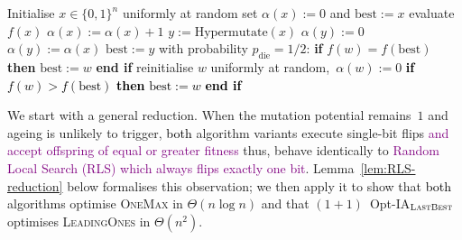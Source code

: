 \documentclass[lettersize,journal]{IEEEtran}
\newcommand{\new}[1]{\textcolor{black}{#1}}
\newcommand{\rerev}[1]{\textcolor{purple}{#1}}
\newcommand{\rev}[1]{\textcolor{black}{#1}}
\newcommand{\lastBest}{$(1+1)$~Opt-IA$_{\textsc{LastBest}}$}
\begin{document}
\begin{algorithm}[t] 
 		\caption{$(1+1)$~Opt-IA$_{\textsc{FirstBest}}$ }
 		\begin{algorithmic}[1] \STATE Initialise $x \in\{0,1\}^n$ uniformly at random \STATE set $\alpha(x):=0$ and $\text{best}:=x$      
 			\STATE evaluate $f(x)$    
 			 \STATE $\alpha(x):=\alpha(x)+1$
 			\STATE $y:=\text{Hypermutate}(x)$
 			\STATE $\alpha(y):=0$
 			\ELSE
 			\STATE $\alpha(y):=\alpha(x)$
 			\ENDIF
 			\STATE $\text{best}:=y$
 			\ENDIF
 			\STATE with probability $p_{\text{die}}=1/2$:
 			\STATE \hspace{\algorithmicindent}
 			\textbf{if} $f(w) = f(\text{best})$ \textbf{then}
 			\STATE \hspace{2\algorithmicindent}
 			$\text{best}:=w$
 			\STATE \hspace{\algorithmicindent}
 			\textbf{end if}
 			\STATE \hspace{\algorithmicindent}
 			reinitialise $w$ uniformly at random,\ $\alpha(w):=0$
 			\textcolor{black}{\STATE \hspace{\algorithmicindent}
 				\textbf{if} $f(w) > f(\text{best})$ \textbf{then}
 				\STATE \hspace{2\algorithmicindent}
 				$\text{best}:=w$
 				\STATE \hspace{\algorithmicindent}
 				\textbf{end if}}
 			\ENDIF
 			\ENDFOR
\rev{ 
\ENDIF}
 			\ENDWHILE
 		\end{algorithmic} 
 		\label{alg:alg2+ageing}
 	\end{algorithm}












We start with a general reduction.  When the mutation potential remains~$1$
and ageing is unlikely to trigger, \new{both} algorithm variants execute
single-bit flips \rerev{and accept offspring of equal or greater fitness} thus, behave identically to \rerev{Random Local Search (RLS) which always flips exactly one bit}.
Lemma~\ref{lem:RLS-reduction} below formalises this observation;
we then apply it to show that \new{both} algorithms optimise
\textsc{OneMax} in $\Theta(n\log n)$ and that \lastBest{} optimises
\textsc{LeadingOnes} in $\Theta(n^2)$.
\end{document}
